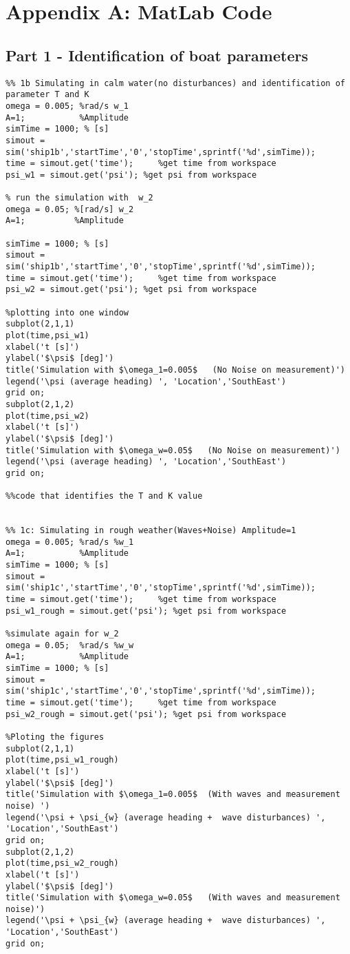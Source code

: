 \newpage
\section{Appendix A: MatLab Code}

\subsection{Part 1 - Identification of boat parameters}
\begin{lstlisting}
%% 1b Simulating in calm water(no disturbances) and identification of parameter T and K
omega = 0.005; %rad/s w_1
A=1;           %Amplitude
simTime = 1000; % [s]
simout = sim('ship1b','startTime','0','stopTime',sprintf('%d',simTime));
time = simout.get('time');     %get time from workspace
psi_w1 = simout.get('psi'); %get psi from workspace

% run the simulation with  w_2
omega = 0.05; %[rad/s] w_2
A=1;          %Amplitude

simTime = 1000; % [s]
simout = sim('ship1b','startTime','0','stopTime',sprintf('%d',simTime));
time = simout.get('time');     %get time from workspace
psi_w2 = simout.get('psi'); %get psi from workspace

%plotting into one window
subplot(2,1,1)
plot(time,psi_w1)
xlabel('t [s]')
ylabel('$\psi$ [deg]')
title('Simulation with $\omega_1=0.005$   (No Noise on measurement)')
legend('\psi (average heading) ', 'Location','SouthEast')
grid on;
subplot(2,1,2)
plot(time,psi_w2)
xlabel('t [s]')
ylabel('$\psi$ [deg]')
title('Simulation with $\omega_w=0.05$   (No Noise on measurement)')
legend('\psi (average heading) ', 'Location','SouthEast')
grid on;

%%code that identifies the T and K value


%% 1c: Simulating in rough weather(Waves+Noise) Amplitude=1
omega = 0.005; %rad/s %w_1
A=1;           %Amplitude
simTime = 1000; % [s]
simout = sim('ship1c','startTime','0','stopTime',sprintf('%d',simTime));
time = simout.get('time');     %get time from workspace
psi_w1_rough = simout.get('psi'); %get psi from workspace

%simulate again for w_2
omega = 0.05;  %rad/s %w_w
A=1;           %Amplitude
simTime = 1000; % [s]
simout = sim('ship1c','startTime','0','stopTime',sprintf('%d',simTime));
time = simout.get('time');     %get time from workspace
psi_w2_rough = simout.get('psi'); %get psi from workspace

%Ploting the figures
subplot(2,1,1)
plot(time,psi_w1_rough)
xlabel('t [s]')
ylabel('$\psi$ [deg]')
title('Simulation with $\omega_1=0.005$  (With waves and measurement noise) ')
legend('\psi + \psi_{w} (average heading +  wave disturbances) ', 'Location','SouthEast')
grid on;
subplot(2,1,2)
plot(time,psi_w2_rough)
xlabel('t [s]')
ylabel('$\psi$ [deg]')
title('Simulation with $\omega_w=0.05$   (With waves and measurement noise)')
legend('\psi + \psi_{w} (average heading +  wave disturbances) ', 'Location','SouthEast')
grid on;



\end{lstlisting}
